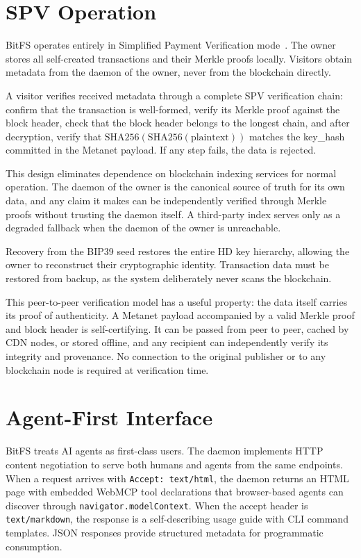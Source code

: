\documentclass[11pt,a4paper]{article}
\begin{document}
\section{SPV Operation}

BitFS operates entirely in Simplified Payment Verification mode~\cite{spv}. The owner stores all self-created transactions and their Merkle proofs locally. Visitors obtain metadata from the daemon of the owner, never from the blockchain directly.

A visitor verifies received metadata through a complete SPV verification chain: confirm that the transaction is well-formed, verify its Merkle proof against the block header, check that the block header belongs to the longest chain, and after decryption, verify that $\text{SHA256}(\text{SHA256}(\text{plaintext}))$ matches the key\_hash committed in the Metanet payload. If any step fails, the data is rejected.

This design eliminates dependence on blockchain indexing services for normal operation. The daemon of the owner is the canonical source of truth for its own data, and any claim it makes can be independently verified through Merkle proofs without trusting the daemon itself. A third-party index serves only as a degraded fallback when the daemon of the owner is unreachable.

Recovery from the BIP39 seed restores the entire HD key hierarchy, allowing the owner to reconstruct their cryptographic identity. Transaction data must be restored from backup, as the system deliberately never scans the blockchain.

This peer-to-peer verification model has a useful property: the data itself carries its proof of authenticity. A Metanet payload accompanied by a valid Merkle proof and block header is self-certifying. It can be passed from peer to peer, cached by CDN nodes, or stored offline, and any recipient can independently verify its integrity and provenance. No connection to the original publisher or to any blockchain node is required at verification time.

\section{Agent-First Interface}

BitFS treats AI agents as first-class users. The daemon implements HTTP content negotiation to serve both humans and agents from the same endpoints. When a request arrives with \texttt{Accept: text/html}, the daemon returns an HTML page with embedded WebMCP tool declarations that browser-based agents can discover through \texttt{navigator.modelContext}. When the accept header is \texttt{text/markdown}, the response is a self-describing usage guide with CLI command templates. JSON responses provide structured metadata for programmatic consumption.
\end{document}
